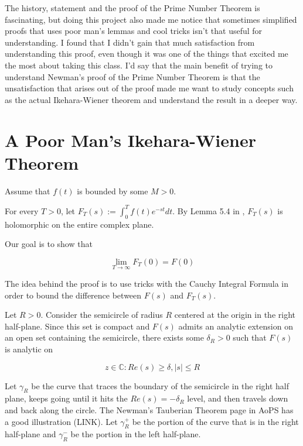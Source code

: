 \documentclass{article}
\theoremstyle{definition}
\newcommand{\C}{\mathbb{C}}
\begin{document}
The history, statement and the proof of the Prime Number Theorem is fascinating, but doing this project
also made me notice that sometimes simplified proofs that uses poor man's lemmas and cool tricks isn't that useful for understanding.
I found that I didn't gain that much satisfaction from understanding this proof, even though it was one of the
things that excited me the most about taking this class. I'd say that the main benefit
of trying to understand Newman's proof of the Prime Number Theorem is that the unsatisfaction that arises out of 
the proof made me want to study concepts such as the actual Ikehara-Wiener theorem and understand the result in a
deeper way.

\newpage

 
 

\newpage

\appendix


\section{A Poor Man's Ikehara-Wiener Theorem}

Assume that $ f(t) $ is bounded by some $ M > 0 $.

For every $ T > 0 $, let $ F_{T}(s) := \int_{0}^{T} f(t)e^{-st}dt $.
By Lemma 5.4 in \cite{shakarchi_complex_nodate}, $ F_{T}(s) $ is holomorphic on the entire complex plane.

Our goal is to show that 

\[ \lim_{T \to \infty} F_{T}(0) = F(0) \] 


The idea behind the proof is to use tricks with the Cauchy Integral Formula
in order to bound the difference between $ F(s) $ and $ F_{T}(s) $.

Let $ R > 0 $.
Consider the semicircle of radius $ R $ centered at the origin in the right half-plane.
Since this set is compact and $ F(s) $ admits an analytic extension on an open 
set containing the semicircle, there
exists some $ \delta_{R} > 0 $ such that $ F(s) $ is analytic on 

\[ z \in \C : Re(s) \geq \delta, \lvert s \rvert \leq R \]

Let $ \gamma_{R} $ be the curve that traces the boundary of the semicircle in the right half plane,
keeps going until it hits the $ Re(s) = - \delta_{R} $ level, and then travels down and back along
the circle. The Newman's Tauberian Theorem page in AoPS has a good illustration (LINK). Let $ \gamma_{R}^{+} $
be the portion of the curve that is in the right half-plane and $ \gamma_{R}^{-} $ be the portion in the
left half-plane.
\end{document}

